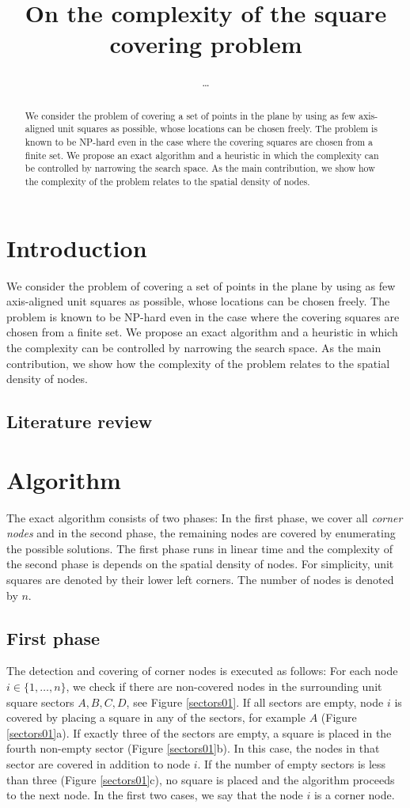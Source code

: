 \documentclass{article}
\title{On the complexity of the square covering problem}
\author{\ldots}
\begin{document}
\maketitle
\begin{abstract}
We consider the problem of covering a set of points in the plane by 
using as few axis-aligned unit squares as possible, whose locations can be chosen freely. 
The problem is known to be NP-hard even in the case where the covering 
squares are chosen from a finite set. We propose an exact algorithm and a heuristic
in which the complexity can be controlled by narrowing the search space.
As the main contribution, we show how the complexity of the problem relates to the 
spatial density of nodes.
\end{abstract}
\section{Introduction}
We consider the problem of covering a set of points in the plane by 
using as few axis-aligned unit squares as possible, whose locations can be chosen freely. 
The problem is known to be NP-hard even in the case where the covering 
squares are chosen from a finite set. We propose an exact algorithm and a heuristic
in which the complexity can be controlled by narrowing the search space.
As the main contribution, we show how the complexity of the problem relates to the 
spatial density of nodes.

\subsection{Literature review}

\section{Algorithm}
The exact algorithm consists of two phases: In the first phase, we cover all \emph{corner nodes} 
and in the second phase, the remaining nodes are covered by enumerating the
possible solutions. The first phase runs in linear time and the complexity of the 
second phase is depends on the spatial density of nodes. For simplicity, unit squares 
are denoted by their lower left corners. The number of nodes is denoted by $n$.
\subsection{First phase}
The detection and covering of corner nodes is executed as follows: For each node $i \in \{1,\ldots,n\}$,
we check if there are non-covered nodes in the surrounding unit square sectors $A,B,C,D$, see Figure \ref{sectors01}. 
If all sectors are empty, node $i$ is covered by placing a square in any of the
sectors, for example $A$ (Figure \ref{sectors01}a). If exactly three of the sectors are empty, a square is placed in 
the fourth non-empty sector (Figure \ref{sectors01}b). 
In this case, the nodes in that sector are covered in addition to node $i$.
If the number of empty sectors is less than three (Figure \ref{sectors01}c), no square is placed and 
the algorithm proceeds to the next node.
In the first two cases, we say that the node $i$ is a corner node.
\end{document}
